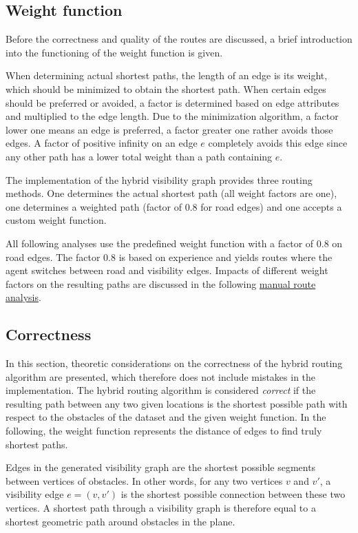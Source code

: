 	\subsection{Weight function}
	
		Before the correctness and quality of the routes are discussed, a brief introduction into the functioning of the weight function is given.
		
		When determining actual shortest paths, the length of an edge is its weight, which should be minimized to obtain the shortest path.
		When certain edges should be preferred or avoided, a factor is determined based on edge attributes and multiplied to the edge length.
		Due to the minimization algorithm, a factor lower one means an edge is preferred, a factor greater one rather avoids those edges.
		A factor of positive infinity on an edge $e$ completely avoids this edge since any other path has a lower total weight than a path containing $e$.
		
		The implementation of the hybrid visibility graph provides three routing methods.
		One determines the actual shortest path (all weight factors are one), one determines a weighted path (factor of 0.8 for road edges) and one accepts a custom weight function.
		
		All following analyses use the predefined weight function with a factor of 0.8 on road edges.
		The factor 0.8 is based on experience and yields routes where the agent switches between road and visibility edges.
		Impacts of different weight factors on the resulting paths are discussed in the following \hyperref[subsubsec:manual-route-analysis]{manual route analysis}.

	\subsection{Correctness}
	\label{subsec:correctness}
	
		In this section, theoretic considerations on the correctness of the hybrid routing algorithm are presented, which therefore does not include mistakes in the implementation.
		The hybrid routing algorithm is considered \emph{correct} if the resulting path between any two given locations is the shortest possible path with respect to the obstacles of the dataset and the given weight function.
		In the following, the weight function represents the distance of edges to find truly shortest paths.
		
		Edges in the generated visibility graph are the shortest possible segments between vertices of obstacles.
		In other words, for any two vertices $v$ and $v'$, a visibility edge $e=(v, v')$ is the shortest possible connection between these two vertices.
		A shortest path through a visibility graph is therefore equal to a shortest geometric path around obstacles in the plane.
		
